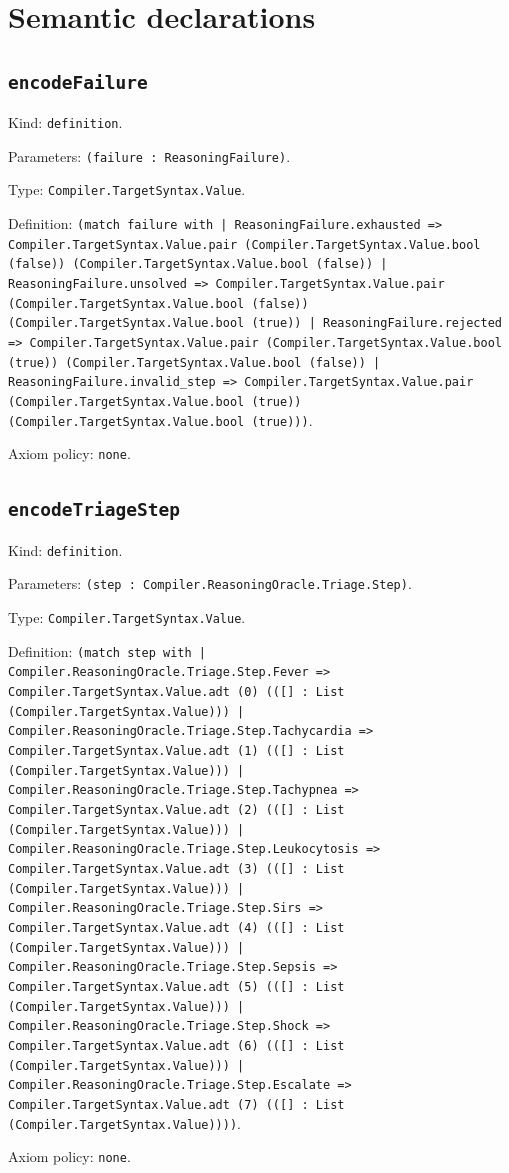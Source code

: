 \documentclass[11pt]{article}
\begin{document}
\section*{Semantic declarations}
\subsection*{\texttt{encodeFailure}}
\noindent Kind: \texttt{definition}.\par
\noindent Parameters: \texttt{(failure : ReasoningFailure)}.\par
\noindent Type: \texttt{Compiler.TargetSyntax.Value}.\par
\noindent Definition: \texttt{(match failure with | ReasoningFailure.exhausted => Compiler.TargetSyntax.Value.pair (Compiler.TargetSyntax.Value.bool (false)) (Compiler.TargetSyntax.Value.bool (false)) | ReasoningFailure.unsolved => Compiler.TargetSyntax.Value.pair (Compiler.TargetSyntax.Value.bool (false)) (Compiler.TargetSyntax.Value.bool (true)) | ReasoningFailure.rejected => Compiler.TargetSyntax.Value.pair (Compiler.TargetSyntax.Value.bool (true)) (Compiler.TargetSyntax.Value.bool (false)) | ReasoningFailure.invalid\_step => Compiler.TargetSyntax.Value.pair (Compiler.TargetSyntax.Value.bool (true)) (Compiler.TargetSyntax.Value.bool (true)))}.\par
\noindent Axiom policy: \texttt{none}.\par
\subsection*{\texttt{encodeTriageStep}}
\noindent Kind: \texttt{definition}.\par
\noindent Parameters: \texttt{(step : Compiler.ReasoningOracle.Triage.Step)}.\par
\noindent Type: \texttt{Compiler.TargetSyntax.Value}.\par
\noindent Definition: \texttt{(match step with | Compiler.ReasoningOracle.Triage.Step.Fever => Compiler.TargetSyntax.Value.adt (0) (([] : List (Compiler.TargetSyntax.Value))) | Compiler.ReasoningOracle.Triage.Step.Tachycardia => Compiler.TargetSyntax.Value.adt (1) (([] : List (Compiler.TargetSyntax.Value))) | Compiler.ReasoningOracle.Triage.Step.Tachypnea => Compiler.TargetSyntax.Value.adt (2) (([] : List (Compiler.TargetSyntax.Value))) | Compiler.ReasoningOracle.Triage.Step.Leukocytosis => Compiler.TargetSyntax.Value.adt (3) (([] : List (Compiler.TargetSyntax.Value))) | Compiler.ReasoningOracle.Triage.Step.Sirs => Compiler.TargetSyntax.Value.adt (4) (([] : List (Compiler.TargetSyntax.Value))) | Compiler.ReasoningOracle.Triage.Step.Sepsis => Compiler.TargetSyntax.Value.adt (5) (([] : List (Compiler.TargetSyntax.Value))) | Compiler.ReasoningOracle.Triage.Step.Shock => Compiler.TargetSyntax.Value.adt (6) (([] : List (Compiler.TargetSyntax.Value))) | Compiler.ReasoningOracle.Triage.Step.Escalate => Compiler.TargetSyntax.Value.adt (7) (([] : List (Compiler.TargetSyntax.Value))))}.\par
\noindent Axiom policy: \texttt{none}.\par
\end{document}
